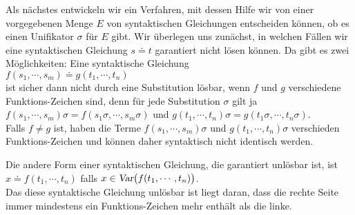 Als n\"{a}chstes entwickeln wir ein Verfahren, mit dessen Hilfe wir von einer vorgegebenen
Menge $E$ von syntaktischen Gleichungen entscheiden k\"{o}nnen, ob es einen Unifikator $\sigma$ f\"{u}r $E$
gibt.  Wir \"{u}berlegen uns zun\"{a}chst, in welchen F\"{a}llen wir eine syntaktischen Gleichung $s \doteq t$
garantiert nicht l\"{o}sen k\"{o}nnen.  Da gibt es zwei M\"{o}glichkeiten: Eine syntaktische Gleichung  \\[0.2cm]
\hspace*{1.3cm} $f(s_1,\cdots,s_m) \doteq g(t_1,\cdots, t_n)$ \\[0.2cm]
ist sicher dann nicht durch eine Substitution l\"{o}sbar, wenn $f$ und $g$ verschiedene
Funktions-Zeichen sind, denn f\"{u}r jede Substitution $\sigma$ gilt ja \\[0.2cm]
\hspace*{1.0cm} $f(s_1,\cdots,s_m)\sigma = f(s_1\sigma,\cdots,s_m\sigma)$ \quad und \quad
                $g(t_1,\cdots, t_n)\sigma = g(t_1\sigma,\cdots,t_n\sigma)$. \\[0.2cm]
Falls $f \not = g$ ist, haben die Terme  $f(s_1,\cdots,s_m)\sigma$ und $g(t_1,\cdots, t_n)\sigma$ verschieden
Funktions-Zeichen und k\"{o}nnen daher syntaktisch nicht identisch werden.

Die andere Form einer syntaktischen Gleichung, die garantiert unl\"{o}sbar ist, ist\\[0.2cm]
\hspace*{1.3cm} $x \doteq f(t_1,\cdots,t_n)$  \quad falls $x \in \textsl{Var}\big(f(t_1,\cdots,t_n)\big)$. \\[0.2cm]
Das diese syntaktische Gleichung unl\"{o}sbar ist liegt daran, dass die rechte Seite immer mindestens ein
Funktions-Zeichen mehr enth\"{a}lt als die linke.  

